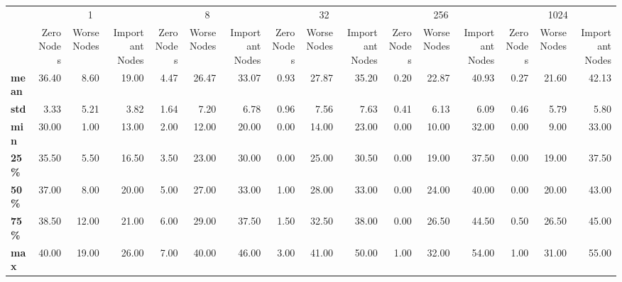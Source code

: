 \begin{tabular}{lrrrrrrrrrrrrrrr}
\toprule
{} & \multicolumn{3}{c}{1} & \multicolumn{3}{c}{8} & \multicolumn{3}{c}{32} & \multicolumn{3}{c}{256} & \multicolumn{3}{c}{1024} \\
{} & Zero Nodes & Worse Nodes & Important Nodes & Zero Nodes & Worse Nodes & Important Nodes & Zero Nodes & Worse Nodes & Important Nodes & Zero Nodes & Worse Nodes & Important Nodes & Zero Nodes & Worse Nodes & Important Nodes \\
\midrule
\textbf{mean} &      36.40 &        8.60 &           19.00 &       4.47 &       26.47 &           33.07 &       0.93 &       27.87 &           35.20 &       0.20 &       22.87 &           40.93 &       0.27 &       21.60 &           42.13 \\
\textbf{std } &       3.33 &        5.21 &            3.82 &       1.64 &        7.20 &            6.78 &       0.96 &        7.56 &            7.63 &       0.41 &        6.13 &            6.09 &       0.46 &        5.79 &            5.80 \\
\textbf{min } &      30.00 &        1.00 &           13.00 &       2.00 &       12.00 &           20.00 &       0.00 &       14.00 &           23.00 &       0.00 &       10.00 &           32.00 &       0.00 &        9.00 &           33.00 \\
\textbf{25\% } &      35.50 &        5.50 &           16.50 &       3.50 &       23.00 &           30.00 &       0.00 &       25.00 &           30.50 &       0.00 &       19.00 &           37.50 &       0.00 &       19.00 &           37.50 \\
\textbf{50\% } &      37.00 &        8.00 &           20.00 &       5.00 &       27.00 &           33.00 &       1.00 &       28.00 &           33.00 &       0.00 &       24.00 &           40.00 &       0.00 &       20.00 &           43.00 \\
\textbf{75\% } &      38.50 &       12.00 &           21.00 &       6.00 &       29.00 &           37.50 &       1.50 &       32.50 &           38.00 &       0.00 &       26.50 &           44.50 &       0.50 &       26.50 &           45.00 \\
\textbf{max } &      40.00 &       19.00 &           26.00 &       7.00 &       40.00 &           46.00 &       3.00 &       41.00 &           50.00 &       1.00 &       32.00 &           54.00 &       1.00 &       31.00 &           55.00 \\
\bottomrule
\end{tabular}
